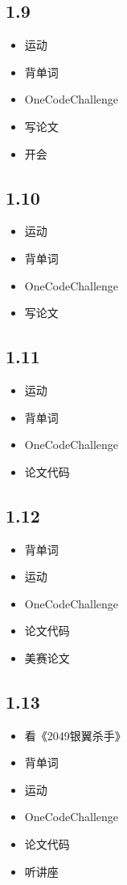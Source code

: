 \documentclass[UTF8]{ctexart}
\begin{document}
\subsection*{1.9}
\begin{itemize}
    \item 运动
    \item 背单词
    \item OneCodeChallenge
    \item 写论文
    \item 开会
\end{itemize}

\subsection*{1.10}
\begin{itemize}
    \item 运动
    \item 背单词
    \item OneCodeChallenge
    \item 写论文
\end{itemize}

\subsection*{1.11}
\begin{itemize}
    \item 运动
    \item 背单词
    \item OneCodeChallenge
    \item 论文代码
\end{itemize}

\subsection*{1.12}
\begin{itemize}
    \item 背单词
    \item 运动
    \item OneCodeChallenge
    \item 论文代码
    \item 美赛论文
\end{itemize}

\subsection*{1.13}
\begin{itemize}
    \item 看《2049银翼杀手》
    \item 背单词
    \item 运动
    \item OneCodeChallenge
    \item 论文代码
    \item 听讲座
\end{itemize}
\end{document}
